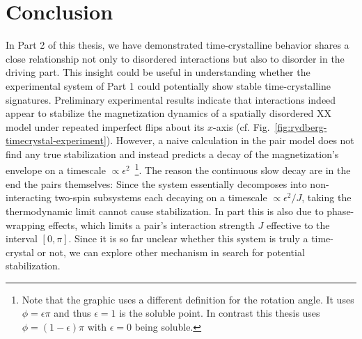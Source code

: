 %
%

\chapter{Conclusion}\label{ch:floquet-discussion}

In Part 2 of this thesis, we have demonstrated time-crystalline behavior shares a close relationship not only to disordered interactions but also to disorder in the driving part.  This insight could be useful in understanding whether the experimental system of Part 1 could potentially show stable time-crystalline signatures. Preliminary experimental results indicate that interactions indeed appear to stabilize the magnetization dynamics of a spatially disordered XX model under repeated imperfect flips about its $x$-axis (cf. Fig.~\ref{fig:rydberg-timecrystal-experiment}). However, a naive calculation in the pair model does not find any true stabilization and instead predicts a decay of the magnetization's envelope on a timescale $\propto\epsilon^2$~\footnote{Note that the graphic uses a different definition for the rotation angle. It uses $\phi=\epsilon \pi$ and thus $\epsilon = 1$ is the soluble point. In contrast this thesis uses $\phi=(1-\epsilon)\pi$ with $\epsilon=0$ being soluble.}. The reason the continuous slow decay are in the end the pairs themselves: Since the system essentially decomposes into non-interacting two-spin subsystems each decaying on a timescale $\propto \epsilon^2/J$, taking the thermodynamic limit cannot cause stabilization. In part this is also due to phase-wrapping effects, which limits a pair's interaction strength $J$ effective to the interval $[0,\pi]$. Since it is so far unclear whether this system is truly a time-crystal or not, we can explore other mechanism in search for potential stabilization. 

